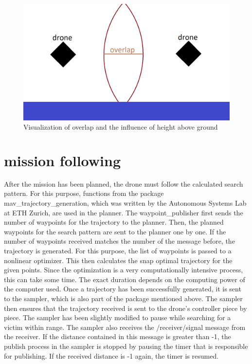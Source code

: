 \documentclass[conference]{IEEEtran}
\begin{document}
\begin{figure}[htbp]
\centerline{\includegraphics[width=1\columnwidth]{heightComp.png}}
\caption{Visualization of overlap and the influence of height above ground}
\label{fig:heightComp}
\end{figure}

\section{mission following}
After the mission has been planned, the drone must follow the calculated search pattern. For this purpose, functions from the package mav\_trajectory\_generation, which was written by the Autonomous Systems Lab at ETH Zurich\cite{b1}, are used in the planner. 
The waypoint\_publisher first sends the number of waypoints for the trajectory to the planner. Then, the planned waypoints for the search pattern are sent to the planner one by one. If the number of waypoints received matches the number of the message before, the trajectory is generated. For this purpose, the list of waypoints is passed to a nonlinear optimizer. This then calculates the snap optimal trajectory for the given points. Since the optimization is a very computationally intensive process, this can take some time. The exact duration depends on the computing power of the computer used.
Once a trajectory has been successfully generated, it is sent to the sampler, which is also part of the package mentioned above. The sampler then ensures that the trajectory received is sent to the drone's controller piece by piece. The sampler has been slightly modified to pause while searching for a victim within range.
The sampler also receives the /receiver/signal message from the receiver. If the distance contained in this message is greater than -1, the publish process in the sampler is stopped by pausing the timer that is responsible for publishing. If the received distance is -1 again, the timer is resumed.
\end{document}
